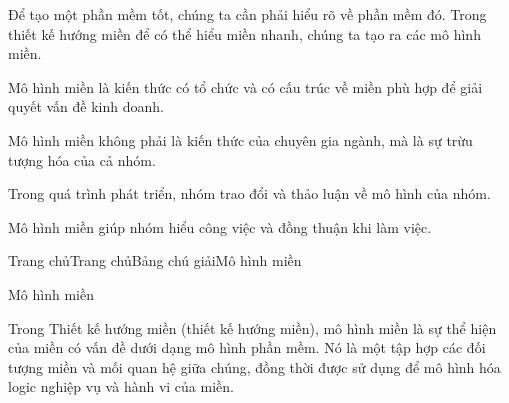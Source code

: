 
Để tạo một phần mềm tốt, chúng ta cần phải hiểu rõ về phần mềm đó. Trong thiết kế hướng miền để có thể hiểu miền nhanh, chúng ta tạo ra các mô hình miền.

Mô hình miền là kiến thức có tổ chức và có cấu trúc về miền phù hợp để giải quyết vấn đề kinh doanh.

Mô hình miền không phải là kiến thức của chuyên gia ngành, mà là sự trừu tượng hóa của cả nhóm.

Trong quá trình phát triển, nhóm trao đổi và thảo luận về mô hình của nhóm.

Mô hình miền giúp nhóm hiểu công việc và đồng thuận khi làm việc.












Trang chủTrang chủBảng chú giảiMô hình miền

Mô hình miền

Trong Thiết kế hướng miền (thiết kế hướng miền), mô hình miền là sự thể hiện của miền có vấn đề dưới dạng mô hình phần mềm. Nó là một tập hợp các đối tượng miền và mối quan hệ giữa chúng, đồng thời được sử dụng để mô hình hóa logic nghiệp vụ và hành vi của miền.

